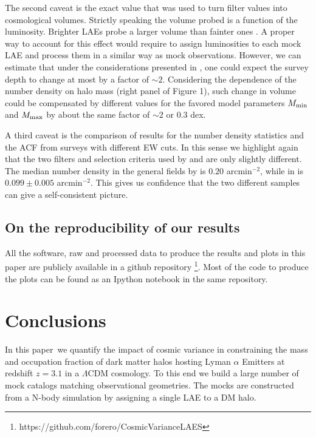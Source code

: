 \documentclass{emulateapj}
\newcommand{\documentname}{paper~}
\newcommand{\ly}{{\ifmmode{{\rm Ly}\alpha}\else{Ly$\alpha$~}\fi}}
\begin{document}
The second caveat is the exact value that was used to turn
  filter values into cosmological volumes. Strictly speaking the
  volume probed is a function of the \ly luminosity. Brighter LAEs
  probe a larger volume than fainter ones \citep{Gronwall07}. A proper
way to account for this effect would require to assign luminosities to
each mock LAE and process them in a similar way as mock
observations. However, we can estimate that under the considerations
presented in \citep{Gronwall07}, one could expect the survey depth to
change at most by a factor of $\sim2$. Considering the dependence
of the number density on halo mass (right panel of Figure 1), such
change in volume could be compensated by different values for the
favored model parameters $M_{\rm  min}$ and $M_{\rm max}$ by about the
same factor of $\sim2$ or $0.3$ dex. 

A third caveat is the comparison of results for the number density
  statistics and the ACF from surveys with different EW cuts. In this
  sense we highlight again that the two filters and selection
  criteria used by \citep{Ouchi2008} and \citep{Yamada2012} are only
  slightly different. The median number density in the general fields by
  \citep{Yamada2012} is $0.20$ arcmin$^{-2}$, while in
  \citep{Ouchi2008} is $0.099\pm0.005$ arcmin$^{-2}$. This gives us
  confidence that the two different samples can give a self-consistent
  picture.




\subsection{On the reproducibility of our results}

All the software, raw and processed data to produce the results
and plots in this paper are publicly available in a github
repository \footnote{https://github.com/forero/CosmicVarianceLAES}. Most
of the code to produce the plots can be found as an Ipython notebook
\citep{IPython} in the same repository.



\section{Conclusions}
\label{sec:conclusions}

In this \documentname we quantify the impact of cosmic variance in
constraining the  mass and occupation fraction of dark matter halos
hosting Lyman $\alpha$ Emitters at redshift $z=3.1$ in a $\Lambda$CDM
cosmology.  To this end we build a large number of mock catalogs
matching observational geometries. The mocks are constructed from a
N-body simulation by assigning a single LAE to a DM halo.
 
\end{document}
